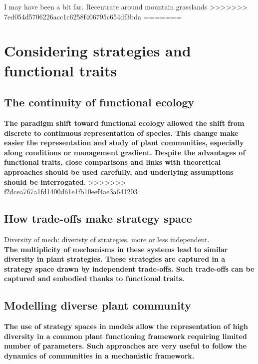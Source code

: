 \indent I may have been a bit far. Recentrate around mountain grasslands
>>>>>>> 7ed054d5706226acc1c6258f406795c654df3bda
=======
\chapter{Considering strategies and functional traits}
\section{The continuity of functional ecology}

\textbf{The paradigm shift toward functional ecology allowed the shift from discrete to continuous representation of species. This change make easier the representation and study of plant communities, especially along conditions or management gradient. Despite the advantages of functional traits, close comparisons and links with theoretical approaches should be used carefully, and underlying assumptions should be interrogated.}
>>>>>>> f2dcea767a1fd1400d61e1fb10eef4ae3a641203

\section{How trade-offs make strategy space}

Diversity of mech: diveristy of strategies. more or less independent.\\

\textbf{The multiplicity of mechanisms in these systems lead to similar diversity in plant strategies. These strategies are captured in a strategy space drawn by independent trade-offs. Such trade-offs can be captured and embodied thanks to functional traits.}


\section{Modelling diverse plant community}

\textbf{The use of strategy spaces in models allow the representation of high diversity in a common plant functioning framework requiring limited number of parameters. Such approaches are very useful to follow the dynamics of communities in a mechanistic framework. }

